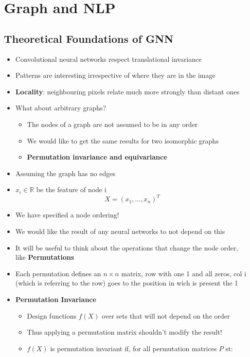\chapter{Graph and NLP}
\section{Theoretical Foundations of GNN}
\begin{itemize}
    \item Convolutional neural networks respect translational invariance
    \item Patterns are interesting irrespective of where they are in the image
    \item \textbf{Locality}: neighbouring pixels relate much more strongly than distant ones
    \item What about arbitrary graphs?
    \begin{itemize}
        \item The nodes of a graph are not assumed to be in any order 
        \item We would like to get the same results for two isomorphic graphs
        \item \textbf{Permutation invariance and equivariance}
    \end{itemize}
    \item Assuming the graph has no edges
    \item \(x_i \in \mathbb{R}\) be the feature of node i
    \[X = (x_1, ..., x_n)^T\]
    \item We have specified a node ordering!
    \item We would like the result of any neural networks to not depend on this
    \item It will be useful to think about the operations that change the node order, like \textbf{Permutations}
    \item Each permutation defines an \(n \times n\) matrix, row with one 1 and all zeros, col i (which is referring to the row) goes to the position in wich is present the 1
    \item \textbf{Permutation Invariance}
    \begin{itemize}
        \item Design functions \(f(X)\) over sets that will not depend on the order
        \item Thus applying a permutation matrix shouldn’t modify the result!
        \item \(f(X)\) is permutation invariant if, for all permutation matrices \(P\) st: 

\end{itemize}
\end{itemize}

